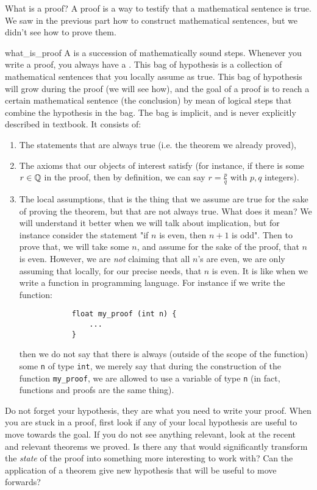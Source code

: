 What is a proof? A proof is a way to testify that a mathematical sentence is true. We saw in the previous part how to construct mathematical sentences, but we didn't see how to prove them.
\begin{cdef}{}{what_is_proof}
    A  is a succession of mathematically sound steps. Whenever you write a proof, you always have a . This bag of hypothesis is a collection of mathematical sentences that you locally assume as true. This bag of hypothesis will grow during the proof (we will see how), and the goal of a proof is to reach a certain mathematical sentence (the conclusion) by mean of logical steps that combine the hypothesis in the bag. The bag is implicit, and is never explicitly described in textbook. It consists of:
    \begin{enumerate}
        \item The statements that are always true (i.e. the theorem we already proved),
        \item The axioms that our objects of interest satisfy (for instance, if there is some \( r \in \mathbb{Q} \) in the proof, then by definition, we can say \( r = \frac p q \) with \( p, q \) integers).
        \item The local assumptions, that is the thing that we assume are true for the sake of proving the theorem, but that are not always true. What does it mean? We will understand it better when we will talk about implication, but for instance consider the statement "if \( n \) is even, then \( n + 1 \) is odd". Then to prove that, we will take some \( n \), and assume for the sake of the proof, that \( n \) is even. However, we are \textit{not} claiming that all \( n \)'s are even, we are only assuming that locally, for our precise needs, that \( n \) is even. It is like when we write a function in programming language. For instance if we write the function:
        \begin{verbatim}
            float my_proof (int n) {
                ...
            }
        \end{verbatim} 
        then we do not say that there is always (outside of the scope of the function) some \verb|n| of type \verb|int|, we merely say that during the construction of the function \verb|my_proof|, we are allowed to use a variable of type \verb|n| (in fact, functions and proofs are the same thing). 
    \end{enumerate}
\end{cdef}
Do not forget your hypothesis, they are what you need to write your proof. When you are stuck in a proof, first look if any of your local hypothesis are useful to move towards the goal. If you do not see anything relevant, look at the recent and relevant theorems we proved. Is there any that would significantly transform the \textit{state} of the proof into something more interesting to work with? Can the application of a theorem give new hypothesis that will be useful to move forwards?



